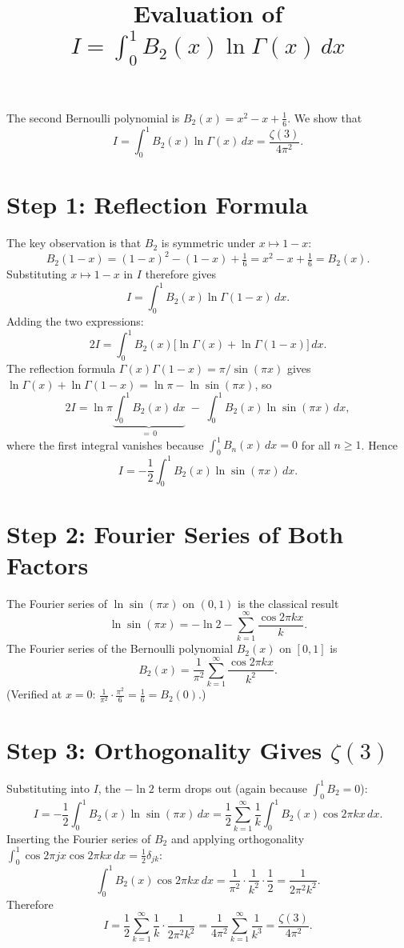 \documentclass{article}
\title{Evaluation of $\displaystyle I = \int_0^1 B_2(x)\ln\Gamma(x)\,dx$}
\author{}
\date{}
\begin{document}
\maketitle

The second Bernoulli polynomial is $B_2(x) = x^2 - x + \tfrac{1}{6}$.
We show that
\[
  I = \int_0^1 B_2(x)\ln\Gamma(x)\,dx = \frac{\zeta(3)}{4\pi^2}.
\]

\section{Step 1: Reflection Formula}

The key observation is that $B_2$ is symmetric under $x\mapsto 1-x$:
\[
  B_2(1-x) = (1-x)^2-(1-x)+\tfrac{1}{6} = x^2-x+\tfrac{1}{6} = B_2(x).
\]
Substituting $x\mapsto 1-x$ in $I$ therefore gives
\[
  I = \int_0^1 B_2(x)\ln\Gamma(1-x)\,dx.
\]
Adding the two expressions:
\[
  2I = \int_0^1 B_2(x)\bigl[\ln\Gamma(x)+\ln\Gamma(1-x)\bigr]\,dx.
\]
The reflection formula $\Gamma(x)\Gamma(1-x) = \pi/\sin(\pi x)$ gives
$\ln\Gamma(x)+\ln\Gamma(1-x) = \ln\pi - \ln\sin(\pi x)$, so
\[
  2I = \ln\pi\underbrace{\int_0^1 B_2(x)\,dx}_{=\,0}
       \;-\;\int_0^1 B_2(x)\ln\sin(\pi x)\,dx,
\]
where the first integral vanishes because $\int_0^1 B_n(x)\,dx = 0$ for all $n\ge 1$.  Hence
\[
  I = -\frac{1}{2}\int_0^1 B_2(x)\ln\sin(\pi x)\,dx.
\]

\section{Step 2: Fourier Series of Both Factors}

The Fourier series of $\ln\sin(\pi x)$ on $(0,1)$ is the classical result
\[
  \ln\sin(\pi x) = -\ln 2 - \sum_{k=1}^\infty \frac{\cos 2\pi kx}{k}.
\]
The Fourier series of the Bernoulli polynomial $B_2(x)$ on $[0,1]$ is
\[
  B_2(x) = \frac{1}{\pi^2}\sum_{k=1}^\infty \frac{\cos 2\pi kx}{k^2}.
\]
(Verified at $x=0$: $\frac{1}{\pi^2}\cdot\frac{\pi^2}{6} = \frac{1}{6} = B_2(0)$.)

\section{Step 3: Orthogonality Gives $\zeta(3)$}

Substituting into $I$, the $-\ln 2$ term drops out (again because $\int_0^1 B_2 = 0$):
\[
  I = -\frac{1}{2}\int_0^1 B_2(x)\ln\sin(\pi x)\,dx
    = \frac{1}{2}\sum_{k=1}^\infty\frac{1}{k}
      \int_0^1 B_2(x)\cos 2\pi kx\,dx.
\]
Inserting the Fourier series of $B_2$ and applying orthogonality
$\int_0^1\cos 2\pi jx\cos 2\pi kx\,dx = \tfrac{1}{2}\delta_{jk}$:
\[
  \int_0^1 B_2(x)\cos 2\pi kx\,dx
  = \frac{1}{\pi^2}\cdot\frac{1}{k^2}\cdot\frac{1}{2}
  = \frac{1}{2\pi^2 k^2}.
\]
Therefore
\[
  I = \frac{1}{2}\sum_{k=1}^\infty\frac{1}{k}\cdot\frac{1}{2\pi^2 k^2}
    = \frac{1}{4\pi^2}\sum_{k=1}^\infty\frac{1}{k^3}
    = \frac{\zeta(3)}{4\pi^2}.
\]
\end{document}
